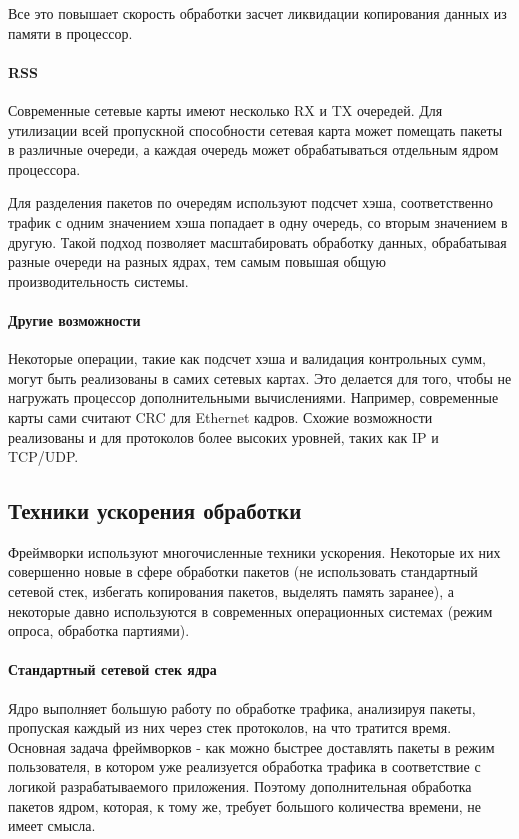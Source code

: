 Все это повышает скорость обработки засчет ликвидации копирования данных из памяти в процессор.

\paragraph{RSS}

Современные сетевые карты имеют несколько RX и TX очередей. Для утилизации всей пропускной способности сетевая карта может помещать пакеты в различные очереди, а каждая очередь может обрабатываться отдельным ядром процессора.

Для разделения пакетов по очередям используют подсчет хэша, соответственно трафик с одним значением хэша попадает в одну очередь, со вторым значением в другую. Такой подход позволяет масштабировать обработку данных, обрабатывая разные очереди на разных ядрах, тем самым повышая общую производительность системы.

\paragraph{Другие возможности}

Некоторые операции, такие как подсчет хэша и валидация контрольных сумм, могут быть реализованы в самих сетевых картах. Это делается для того, чтобы не нагружать процессор дополнительными вычислениями. Например, современные карты сами считают CRC для Ethernet кадров. Схожие возможности реализованы и для протоколов более высоких уровней, таких как IP и TCP/UDP.

\subsection{Техники ускорения обработки}
Фреймворки используют многочисленные техники ускорения. Некоторые их них совершенно новые в сфере обработки пакетов (не использовать стандартный сетевой стек, избегать копирования пакетов, выделять память заранее), а некоторые давно используются в современных операционных системах (режим опроса, обработка партиями).

\paragraph{Стандартный сетевой стек ядра}

Ядро выполняет большую работу по обработке трафика, анализируя пакеты, пропуская каждый из них через стек протоколов, на что тратится время. Основная задача фреймворков - как можно быстрее доставлять пакеты в режим пользователя, в котором уже реализуется обработка трафика в соответствие с логикой разрабатываемого приложения. Поэтому дополнительная обработка пакетов ядром, которая, к тому же, требует большого количества времени, не имеет смысла.


